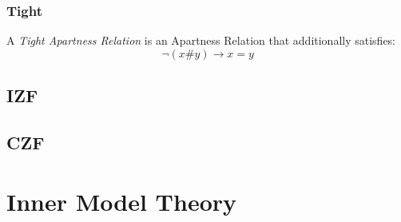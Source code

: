 \subsubsection{Tight}\label{sec:tight}

A \emph{Tight Apartness Relation} is an Apartness Relation that
additionally satisfies:
\[
  \neg (x \# y) \rightarrow x = y
\]



\subsection{IZF}\label{sec:izf}

\subsection{CZF}\label{sec:czf}



\section{Inner Model Theory}\label{sec:inner_model_theory}
